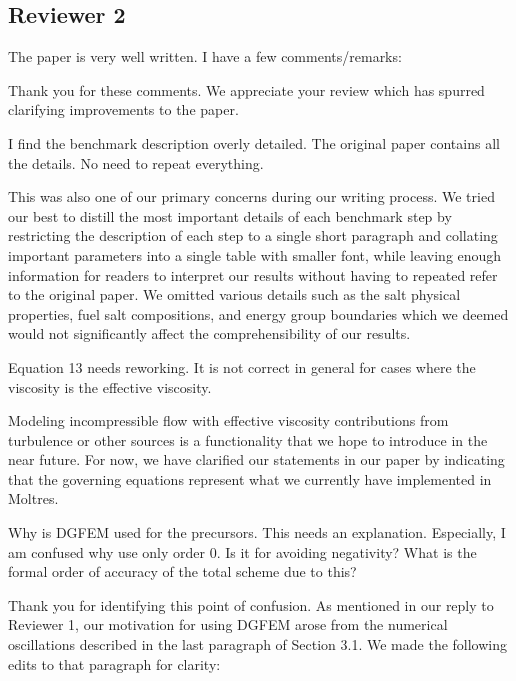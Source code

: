 \documentclass[answers,11pt]{exam}
\begin{document}
\begin{questions}

\section*{Reviewer 2}

        \question The paper is very well written. I have a few
        comments/remarks:
        \begin{solution}
            Thank you for these comments. We appreciate your review which has
            spurred clarifying improvements to the paper.
        \end{solution}
        \question I find the benchmark description overly detailed. The
        original paper contains all the details. No need to repeat everything.
        \begin{solution}
        	This was also one of our primary concerns during our writing
        	process. We tried our best to distill the most important details
        	of each benchmark step by restricting the description of each step
        	to a single short paragraph and collating important parameters into
        	a single table with smaller font, while leaving enough information
        	for readers to interpret our results without having to repeated
        	refer to the original paper. We omitted various details such
        	as the salt physical properties, fuel salt compositions, and energy
        	group boundaries which we deemed would not significantly affect
        	the comprehensibility of our results.
        \end{solution}

        \question Equation 13 needs reworking. It is not correct in general for
        cases where the viscosity is the effective viscosity.
        \begin{solution}
        	Modeling incompressible flow with
        	effective viscosity contributions from turbulence or other sources
        	is a functionality that we hope
        	to introduce in the near future. For now, we have clarified our
        	statements in our paper by indicating that the governing equations
        	represent what we currently have implemented in Moltres.
        \end{solution}

        \question Why is DGFEM used for the precursors. This needs an
        explanation. Especially, I am confused why use only order 0. Is it for
        avoiding negativity? What is the formal order of
        accuracy of the total scheme due to this?
        \begin{solution}
        	Thank you for identifying this point of confusion. As mentioned in
        	our reply to Reviewer 1, our motivation for using DGFEM
        	arose from the numerical oscillations described in the last
        	paragraph of Section 3.1. We made the following edits to that
        	paragraph for clarity:
        	

\end{solution}
\end{questions}
\end{document}
